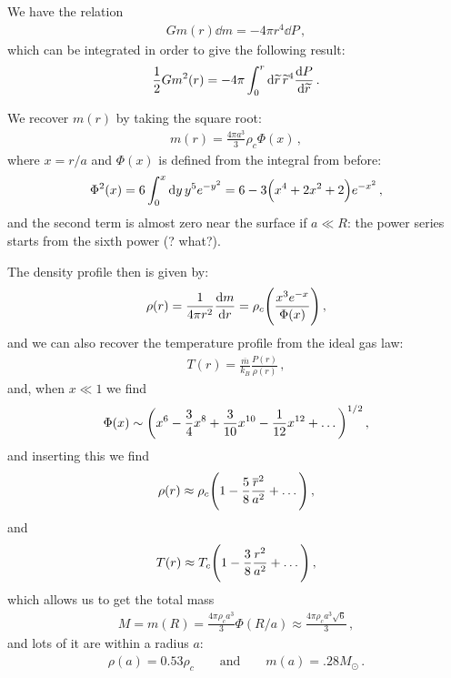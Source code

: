 \documentclass[main.tex]{subfiles}
\begin{document}
We have the relation 
%
\begin{align}
  G m(r) \dd{m} = - 4 \pi r^{4} \dd{P}
\,,
\end{align}
%
which can be integrated in order to give the following result: 
%
\begin{align}
  \frac{1}{2} G m^2(r) = - 4 \pi \int_{0}^{r} \dd{\widetilde{r}} \widetilde{r}^{4} \dv{P}{\widetilde{r}}
\,.
\end{align}

We recover \(m(r)\) by taking the square root: 
%
\begin{align}
  m(r) =  \frac{4 \pi a^3}{3} \rho_c \Phi (x)
\,,
\end{align}
%
where \(x = r/a\) and \(\Phi (x)\) is defined from the integral from before: 
%
\begin{align}
  \Phi^2 (x) = 6 \int_{0}^{x} \dd{y} y^{5} e^{-y^2} 
  = 6 - 3 \qty(x^4 +2 x^2+2) e^{-x^2}
\,,
\end{align}
%
and the second term is almost zero near the surface if \(a \ll R\): the power series starts from the sixth power (? what?). 

The density profile then is given by:
%
\begin{align}
  \rho (r) = \frac{1}{4 \pi r^2} \dv{m}{r}
  = \rho_{c} \qty(\frac{x^3 e^{-x}}{\Phi (x)})
\,,
\end{align}
%
and we can also recover the temperature profile from the ideal gas law: 
%
\begin{align}
  T(r) = \frac{\overline{m}}{k_B} \frac{P(r)}{\rho (r)}
\,,
\end{align}
%
and, when \(x \ll 1\) we find 
%
\begin{align}
  \Phi (x) \sim \qty(x^{6} - \frac{3}{4} x^{8} + \frac{3}{10} x^{10} - \frac{1}{12} x^{12}+ \dots)^{1/2}
\,,
\end{align}
%
and inserting this we find 
%
\begin{align}
  \rho (r) \approx \rho _c \qty(1 - \frac{5}{8} \frac{\overline{r}^2}{a^2} + \dots)
\,,
\end{align}
%
and 
%
\begin{align}
  T(r) \approx T_c \qty( 1 - \frac{3}{8} \frac{r^2}{a^2} + \dots)
\,,
\end{align}
%
which allows us to get the total mass 
%
\begin{align}
  M = m(R) = \frac{4 \pi \rho_c a^3}{3} \Phi (R/a) \approx
  \frac{4 \pi \rho _c a^3 \sqrt{6}}{3} 
\,,
\end{align}
%
and lots of it are within a radius \(a\): 
%
\begin{align}
  \rho (a) = 0.53 \rho _c
  \qquad
  \text{and}
  \qquad
  m(a) = \num{.28} M_{\odot}
\,.
\end{align}
%
\end{document}

